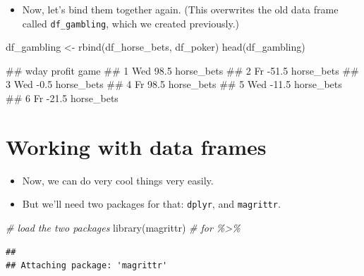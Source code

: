 \documentclass[
]{book}
\newenvironment{Shaded}{\begin{snugshade}}{\end{snugshade}}
\newcommand{\CommentTok}[1]{\textcolor[rgb]{0.56,0.35,0.01}{\textit{#1}}}
\newcommand{\FunctionTok}[1]{\textcolor[rgb]{0.00,0.00,0.00}{#1}}
\newcommand{\NormalTok}[1]{#1}
\newcommand{\OtherTok}[1]{\textcolor[rgb]{0.56,0.35,0.01}{#1}}
\providecommand{\tightlist}{%
  \setlength{\itemsep}{0pt}\setlength{\parskip}{0pt}}
\begin{document}
\begin{itemize}
\tightlist
\item
  Now, let's bind them together again. (This overwrites the old data frame called \texttt{df\_gambling}, which we created previously.)
\end{itemize}

\begin{Shaded}
\begin{Highlighting}[]
\NormalTok{df\_gambling }\OtherTok{\textless{}{-}} \FunctionTok{rbind}\NormalTok{(df\_horse\_bets, df\_poker)}
\FunctionTok{head}\NormalTok{(df\_gambling)}
\end{Highlighting}
\end{Shaded}

\begin{Shaded}
\begin{Highlighting}[]
\NormalTok{\#\#   wday profit       game}
\NormalTok{\#\# 1  Wed   98.5 horse\_bets}
\NormalTok{\#\# 2   Fr  {-}51.5 horse\_bets}
\NormalTok{\#\# 3  Wed   {-}0.5 horse\_bets}
\NormalTok{\#\# 4   Fr   98.5 horse\_bets}
\NormalTok{\#\# 5  Wed  {-}11.5 horse\_bets}
\NormalTok{\#\# 6   Fr  {-}21.5 horse\_bets}
\end{Highlighting}
\end{Shaded}

\hypertarget{working-with-data-frames}{%
\section{Working with data frames}\label{working-with-data-frames}}

\begin{itemize}
\tightlist
\item
  Now, we can do very cool things very easily.
\item
  But we'll need two packages for that: \texttt{dplyr}, and \texttt{magrittr}.
\end{itemize}

\begin{Shaded}
\begin{Highlighting}[]
\CommentTok{\# load the two packages}
\FunctionTok{library}\NormalTok{(magrittr) }\CommentTok{\# for \textquotesingle{}\%\textgreater{}\%\textquotesingle{}}
\end{Highlighting}
\end{Shaded}

\begin{verbatim}
## 
## Attaching package: 'magrittr'
\end{verbatim}
\end{document}
